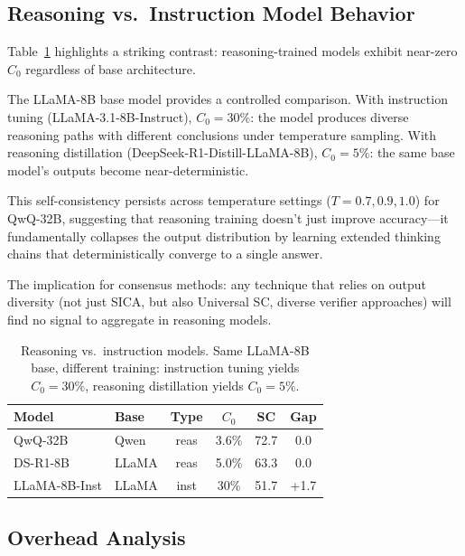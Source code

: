 \documentclass[11pt,a4paper]{article}
\begin{document}
\subsection{Reasoning vs.\ Instruction Model Behavior}
\label{sec:reasoning_taxonomy}

Table~\ref{tab:reasoning_models} highlights a striking contrast: reasoning-trained models exhibit near-zero $C_0$ regardless of base architecture.

The LLaMA-8B base model provides a controlled comparison.
With instruction tuning (LLaMA-3.1-8B-Instruct), $C_0=30\%$: the model produces diverse reasoning paths with different conclusions under temperature sampling.
With reasoning distillation (DeepSeek-R1-Distill-LLaMA-8B), $C_0=5\%$: the same base model's outputs become near-deterministic.

This self-consistency persists across temperature settings ($T=0.7, 0.9, 1.0$) for QwQ-32B, suggesting that reasoning training doesn't just improve accuracy---it fundamentally collapses the output distribution by learning extended thinking chains that deterministically converge to a single answer.

The implication for consensus methods: any technique that relies on output diversity (not just SICA, but also Universal SC, diverse verifier approaches) will find no signal to aggregate in reasoning models.

\begin{table}[t]
\centering
\small
\begin{tabular}{llcccc}
\toprule
\textbf{Model} & \textbf{Base} & \textbf{Type} & $C_0$ & \textbf{SC} & \textbf{Gap} \\
\midrule
QwQ-32B & Qwen & reas & 3.6\% & 72.7 & 0.0 \\
DS-R1-8B & LLaMA & reas & 5.0\% & 63.3 & 0.0 \\
\hdashline
LLaMA-8B-Inst & LLaMA & inst & 30\% & 51.7 & +1.7 \\
\bottomrule
\end{tabular}
\caption{Reasoning vs.\ instruction models. Same LLaMA-8B base, different training: instruction tuning yields $C_0=30\%$, reasoning distillation yields $C_0=5\%$.}
\label{tab:reasoning_models}
\end{table}

\subsection{Overhead Analysis}
\label{sec:overhead}
\end{document}
